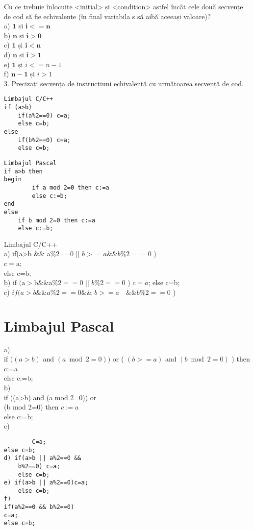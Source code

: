 Cu ce trebuie înlocuite <initial> și <condition> astfel încât cele două secvențe de cod să fie echivalente (în final variabila s să aibă aceeași valoare)?\\
a) $\mathbf{1}$ și $\mathbf{i}<=\mathbf{n}$\\
b) $\mathbf{n}$ și $\mathbf{i}>\mathbf{0}$\\
c) $\mathbf{1}$ și $\mathbf{i}<\mathbf{n}$\\
d) $\mathbf{n}$ și $\mathbf{i}>\mathbf{1}$\\
e) $\mathbf{1}$ și $i<=n-1$\\
f) $\mathbf{n - 1}$ și $i>1$\\
3. Precizați secvența de instrucțiuni echivalentă cu următoarea secvență de cod.

\begin{verbatim}
Limbajul C/C++
if (a>b)
    if(a%2==0) c=a;
    else c=b;
else
    if(b%2==0) c=a;
    else c=b;
\end{verbatim}

\begin{verbatim}
Limbajul Pascal
if a>b then
begin
        if a mod 2=0 then c:=a
        else c:=b;
end
else
    if b mod 2=0 then c:=a
    else c:=b;
\end{verbatim}

Limbajul C/C++\\
a) if(a>b \&\& a\%2==0 || $b>=a \& \& b \% 2==0$ )\\
$\mathrm{c}=\mathrm{a}$;\\
else c=b;\\
b) if $(\mathrm{a}>\mathrm{b} \& \& \mathrm{a} \% 2==0$ || $b \% 2==0$ ) $c=a$; else c=b;\\
c) $i f(a>b \& \& a \% 2==0 \& \&$ $b>=a \quad \& \& b \% 2==0$ )

\section*{Limbajul Pascal}
a)\\
if $((a>b)$ and $(a \bmod 2=0))$ or ( $(b>=a)$ and $(b \bmod 2=0)$ ) then c:=a\\
else c:=b;\\
b)\\
if ((a>b) and (a mod 2=0)) or\\
(b mod 2=0) then $c:=a$\\
else c:=b;\\
c)

\begin{verbatim}
        C=a;
else c=b;
d) if(a>b || a%2==0 &&
    b%2==0) c=a;
    else c=b;
e) if(a>b || a%2==0)c=a;
    else c=b;
f)
if(a%2==0 && b%2==0)
c=a;
else c=b;
\end{verbatim}

